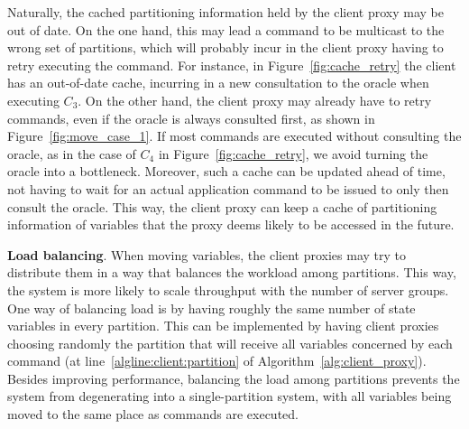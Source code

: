 
Naturally, the cached partitioning information held by the client proxy may be out of date.
On the one hand, this may lead a command to be multicast to the wrong set of partitions, which will probably incur in the client proxy having to retry executing the command.
For instance, in Figure~\ref{fig:cache_retry} the client has an out-of-date cache, incurring in a new consultation to the oracle when executing $C_3$.
On the other hand, the client proxy may already have to retry commands, even if the oracle is always consulted first, as shown in Figure~\ref{fig:move_case_1}.
If most commands are executed without consulting the oracle, as in the case of $C_4$ in Figure~\ref{fig:cache_retry}, we avoid turning the oracle into a bottleneck.
Moreover, such a cache can be updated ahead of time, not having to wait for an actual application command to be issued to only then consult the oracle.
This way, the client proxy can keep a cache of partitioning information of variables that the proxy deems likely to be accessed in the future.

\textbf{Load balancing}. When moving variables, the client proxies may try to distribute them in a way that balances the workload among partitions.
This way, the system is more likely to scale throughput with the number of server groups.
One way of balancing load is by having roughly the same number of state variables in every partition.
This can be implemented by having client proxies choosing randomly the partition that will receive all variables concerned by each command (at line~\ref                {algline:client:partition} of Algorithm~\ref{alg:client_proxy}).
Besides improving performance, balancing the load among partitions prevents the system from degenerating into a single-partition system, with all variables being moved to the same place as commands are executed.









